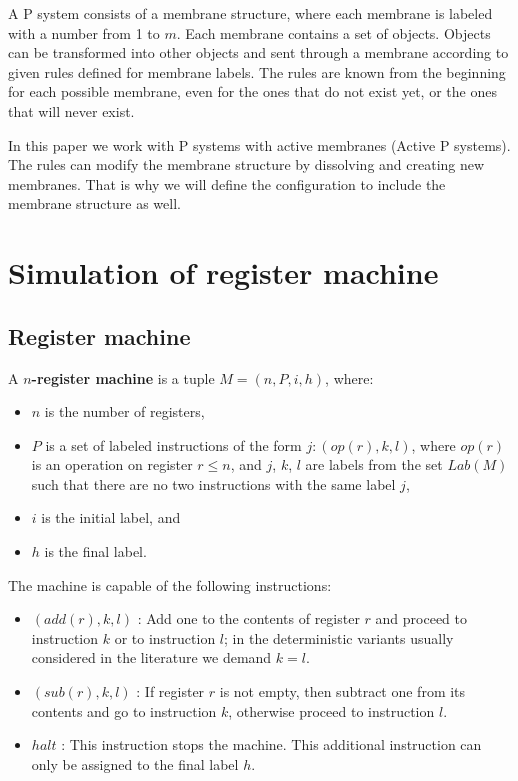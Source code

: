 \documentclass[llncs,submission,copyright,creativecommons]{../lib/lncs/llncs}
\def\red{\color{red}}
\begin{document}
A P system consists of a membrane structure, where each membrane is labeled with a number from 1 to $m$. Each membrane contains a set of objects. Objects can be transformed into other objects and sent through a membrane according to given rules defined for membrane labels. The rules are known from the beginning for each possible membrane, even for the ones that do not exist yet, or the ones that will never exist.

In this paper we work with P systems with active membranes (Active P systems). The rules can modify the membrane structure by dissolving and creating new membranes. That is why we will define the configuration to include the membrane structure as well.




\section{\red Simulation of register machine} %
\label{sec:simulation_of_register_machine}

\subsection{Register machine} %
\label{sub:register_machine}

\begin{definition}
  A {\bf $n$-register machine} is a tuple $M = (n,P,i,h)$, where:
  \begin{itemize}
    \item $n$ is the number of registers,
    \item $P$ is a set of labeled instructions of the form $j : (op(r),k,l)$, where $op(r)$ is an operation on register $r\leq n$, and $j$, $k$, $l$ are labels from the set $Lab(M)$ such that there are no two instructions with the same label $j$,
    \item $i$ is the initial label, and
    \item $h$ is the final label.
  \end{itemize}
\end{definition}

The machine is capable of the following instructions:
\begin{itemize}
  \item $(add(r),k,l)$ : Add one to the contents of register $r$ and proceed to instruction $k$ or to instruction $l$; in the deterministic variants usually considered in the literature we demand $k = l$.
  \item $(sub(r),k,l)$ : If register $r$ is not empty, then subtract one from its contents and go to instruction $k$, otherwise proceed to instruction $l$.
  \item $halt$ : This instruction stops the machine. This additional instruction can only be assigned to the final label $h$.
\end{itemize}
\end{document}

